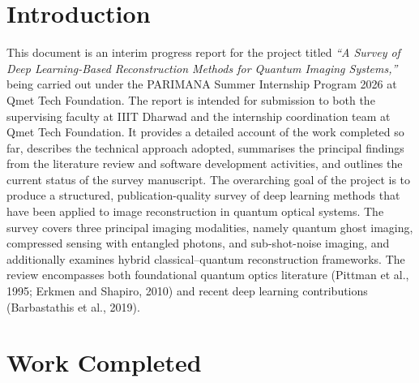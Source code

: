 \documentclass[12pt,a4paper]{article}
\begin{document}
\tableofcontents
\newpage
\section{Introduction}
This document is an interim progress report for the project titled \emph{``A Survey of Deep Learning-Based Reconstruction Methods for Quantum Imaging Systems,''} being carried out under the PARIMANA Summer Internship Program 2026 at Qmet Tech Foundation. The report is intended for submission to both the supervising faculty at IIIT Dharwad and the internship coordination team at Qmet Tech Foundation. It provides a detailed account of the work completed so far, describes the technical approach adopted, summarises the principal findings from the literature review and software development activities, and outlines the current status of the survey manuscript.
The overarching goal of the project is to produce a structured, publication-quality survey of deep learning methods that have been applied to image reconstruction in quantum optical systems. The survey covers three principal imaging modalities, namely quantum ghost imaging, compressed sensing with entangled photons, and sub-shot-noise imaging, and additionally examines hybrid classical--quantum reconstruction frameworks. The review encompasses both foundational quantum optics literature (Pittman et al., 1995; Erkmen and Shapiro, 2010) and recent deep learning contributions (Barbastathis et al., 2019).
\section{Work Completed}
\end{document}
